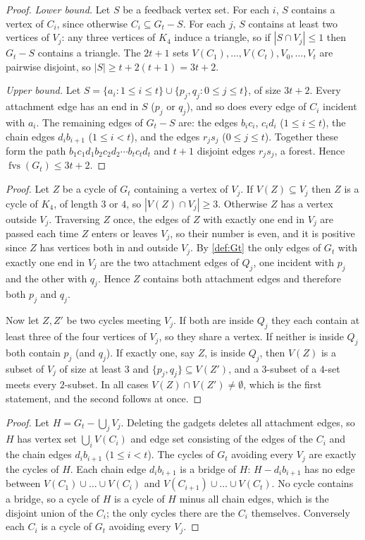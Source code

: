 \documentclass[11pt,a4paper]{article}
\theoremstyle{plain}
\theoremstyle{definition}
\theoremstyle{remark}
\newcommand{\fvs}{\operatorname{fvs}}
\newcommand{\Gtt}{G_t}
\begin{document}
\label{pf:fvs}
\lemfvs*
\begin{proof}
\emph{Lower bound.} Let $S$ be a feedback vertex set. For each $i$, $S$ contains a vertex of $C_i$, since otherwise $C_i\subseteq\Gtt-S$. For each $j$, $S$ contains at least two vertices of $V_j$: any three vertices of $K_4$ induce a triangle, so if $|S\cap V_j|\le1$ then $\Gtt-S$ contains a triangle. The $2t+1$ sets $V(C_1),\dots,V(C_t),V_0,\dots,V_t$ are pairwise disjoint, so $|S|\ge t+2(t+1)=3t+2$.

\emph{Upper bound.} Let $S=\{a_i:1\le i\le t\}\cup\{p_j,q_j:0\le j\le t\}$, of size $3t+2$. Every attachment edge has an end in $S$ ($p_j$ or $q_j$), and so does every edge of $C_i$ incident with $a_i$. The remaining edges of $\Gtt-S$ are: the edges $b_ic_i$, $c_id_i$ ($1\le i\le t$), the chain edges $d_ib_{i+1}$ ($1\le i<t$), and the edges $r_js_j$ ($0\le j\le t$). Together these form the path $b_1c_1d_1b_2c_2d_2\cdots b_tc_td_t$ and $t+1$ disjoint edges $r_js_j$, a forest. Hence $\fvs(\Gtt)\le3t+2$.
\end{proof}

\label{pf:gadget}
\lemgadget*
\begin{proof}
Let $Z$ be a cycle of $\Gtt$ containing a vertex of $V_j$. If $V(Z)\subseteq V_j$ then $Z$ is a cycle of $K_4$, of length $3$ or $4$, so $|V(Z)\cap V_j|\ge3$. Otherwise $Z$ has a vertex outside $V_j$. Traversing $Z$ once, the edges of $Z$ with exactly one end in $V_j$ are passed each time $Z$ enters or leaves $V_j$, so their number is even, and it is positive since $Z$ has vertices both in and outside $V_j$. By \cref{def:Gt} the only edges of $\Gtt$ with exactly one end in $V_j$ are the two attachment edges of $Q_j$, one incident with $p_j$ and the other with $q_j$. Hence $Z$ contains both attachment edges and therefore both $p_j$ and $q_j$.

Now let $Z,Z'$ be two cycles meeting $V_j$. If both are inside $Q_j$ they each contain at least three of the four vertices of $V_j$, so they share a vertex. If neither is inside $Q_j$ both contain $p_j$ (and $q_j$). If exactly one, say $Z$, is inside $Q_j$, then $V(Z)$ is a subset of $V_j$ of size at least $3$ and $\{p_j,q_j\}\subseteq V(Z')$, and a $3$-subset of a $4$-set meets every $2$-subset. In all cases $V(Z)\cap V(Z')\ne\emptyset$, which is the first statement, and the second follows at once.
\end{proof}

\label{pf:chain}
\lemchain*
\begin{proof}
Let $H=\Gtt-\bigcup_{j}V_j$. Deleting the gadgets deletes all attachment edges, so $H$ has vertex set $\bigcup_iV(C_i)$ and edge set consisting of the edges of the $C_i$ and the chain edges $d_ib_{i+1}$ ($1\le i<t$). The cycles of $\Gtt$ avoiding every $V_j$ are exactly the cycles of $H$. Each chain edge $d_ib_{i+1}$ is a bridge of $H$: $H-d_ib_{i+1}$ has no edge between $V(C_1)\cup\dots\cup V(C_i)$ and $V(C_{i+1})\cup\dots\cup V(C_t)$. No cycle contains a bridge, so a cycle of $H$ is a cycle of $H$ minus all chain edges, which is the disjoint union of the $C_i$; the only cycles there are the $C_i$ themselves. Conversely each $C_i$ is a cycle of $\Gtt$ avoiding every $V_j$.
\end{proof}
\end{document}
